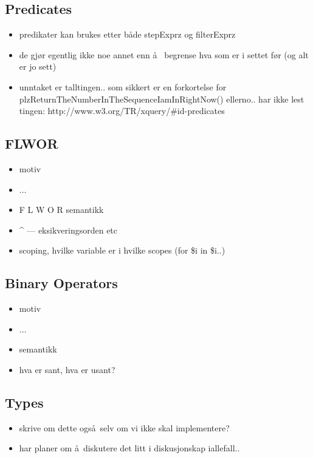 \subsection{Predicates}
\label{sect:theory:xqueryPredicates}
\begin{itemize}
  \item predikater kan brukes etter b\aa de stepExprz og filterExprz
  \item de gj\o r egentlig ikke noe annet enn \aa~ begrense hva som er i settet
  f\o r (og alt er jo sett)
  \item unntaket er talltingen.. som sikkert er en forkortelse for
  plzReturnTheNumberInTheSequenceIamInRightNow() ellerno.. har ikke lest
  tingen: http://www.w3.org/TR/xquery/\#id-predicates
\end{itemize}

\subsection{FLWOR}

\begin{itemize}
\item motiv
\item ...
\item F L W O R semantikk
\item \^{} --- eksikveringsorden etc
\item scoping, hvilke variable er i hvilke scopes (for \$i in \$i..)
\end{itemize}

\subsection{Binary Operators}

\begin{itemize}
\item motiv
\item ...
\item semantikk
\item hva er sant, hva er usant?
\end{itemize}

\subsection{Types}
\begin{itemize}
  \item skrive om dette ogs\aa~selv om vi ikke skal implementere?
  \item har planer om \aa~diskutere det litt i diskusjonskap iallefall..
\end{itemize}

